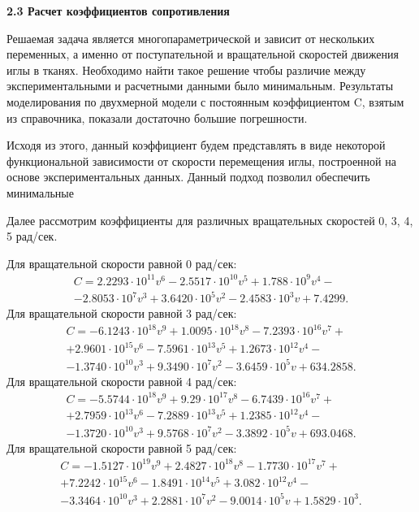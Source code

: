 \documentclass[10pt]{article}
\begin{document}
\bigskip
\textbf{2.3 Расчет коэффициентов сопротивления}

Решаемая задача является многопараметрической и зависит от нескольких переменных, а именно от поступательной и вращательной скоростей движения иглы в тканях. Необходимо найти такое решение чтобы различие между экспериментальными и расчетными данными было минимальным. 
Результаты моделирования по двухмерной модели с постоянным коэффициентом C, взятым из справочника, показали достаточно большие погрешности. 

Исходя из этого, данный коэффициент будем представлять в виде некоторой функциональной зависимости от скорости перемещения иглы, построенной на основе экспериментальных данных.  Данный подход позволил  обеспечить минимальные 

Далее рассмотрим коэффициенты для различных вращательных скоростей 0, 3, 4, 5 рад/сек.  

Для вращательной скорости равной 0 рад/сек:
\begin{multline} \label{eq12}
C= 2.2293\cdot10^{11} v^6 - 2.5517\cdot10^{10} v^5+1.788\cdot10^9 v^4 - \\ -2.8053\cdot10^7 v^3 +3.6420\cdot10^5 v^2-2.4583\cdot10^3 v+7.4299.
\end{multline}
Для вращательной скорости равной 3 рад/сек:
\begin{multline} \label{eq13}
C= -6.1243\cdot10^{18} v^9 + 1.0095\cdot10^{18}v^8 -  7.2393\cdot10^{16} v^7 +\\+ 2.9601\cdot10^{15} v^6 - 7.5961\cdot10^{13} v^5 + 1.2673\cdot10^{12} v^4 - \\-1.3740\cdot10^{10} v^3 + 9.3490\cdot10^7 v^2 - 3.6459\cdot10^5 v+ 634.2858.
\end{multline}
Для вращательной скорости равной 4 рад/сек:
\begin{multline} \label{eq14}
C= -5.5744\cdot10^{18} v^9 + 9.29\cdot10^{17}v^8 -  6.7439\cdot10^{16} v^7 +\\+ 2.7959\cdot10^{13} v^6 - 7.2889\cdot10^{13} v^5 + 1.2385\cdot10^{12} v^4 - \\-1.3720\cdot10^{10} v^3 + 9.5768\cdot10^7 v^2 - 3.3892\cdot10^5 v+ 693.0468.
\end{multline}
Для вращательной скорости равной 5 рад/сек:
\begin{multline} \label{eq14}
C= -1.5127\cdot10^{19} v^9 + 2.4827\cdot10^{18}v^8 -  1.7730\cdot10^{17} v^7 +\\+ 7.2242\cdot10^{15} v^6 - 1.8491\cdot10^{14} v^5 + 3.082\cdot10^{12} v^4 - \\-3.3464\cdot10^{10} v^3 + 2.2881\cdot10^7 v^2 - 9.0014\cdot10^5 v+ 1.5829\cdot10^3.
\end{multline}
\end{document}
